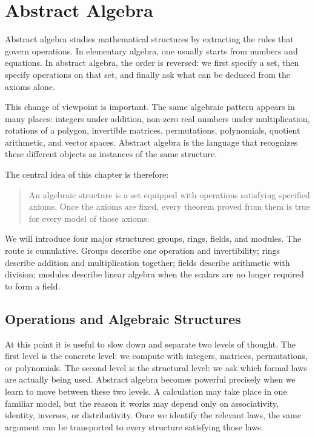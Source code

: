 \chapter{Abstract Algebra}

Abstract algebra studies mathematical structures by extracting the rules that govern operations. In elementary algebra, one usually starts from numbers and equations. In abstract algebra, the order is reversed: we first specify a set, then specify operations on that set, and finally ask what can be deduced from the axioms alone.

This change of viewpoint is important. The same algebraic pattern appears in many places: integers under addition, non-zero real numbers under multiplication, rotations of a polygon, invertible matrices, permutations, polynomials, quotient arithmetic, and vector spaces. Abstract algebra is the language that recognizes these different objects as instances of the same structure.

The central idea of this chapter is therefore:

\begin{quote}
    An algebraic structure is a set equipped with operations satisfying specified axioms. Once the axioms are fixed, every theorem proved from them is true for every model of those axioms.
\end{quote}

We will introduce four major structures: groups, rings, fields, and modules. The route is cumulative. Groups describe one operation and invertibility; rings describe addition and multiplication together; fields describe arithmetic with division; modules describe linear algebra when the scalars are no longer required to form a field.

\section{Operations and Algebraic Structures}


At this point it is useful to slow down and separate two levels of thought. The first level is the concrete level: we compute with integers, matrices, permutations, or polynomials. The second level is the structural level: we ask which formal laws are actually being used. Abstract algebra becomes powerful precisely when we learn to move between these two levels. A calculation may take place in one familiar model, but the reason it works may depend only on associativity, identity, inverses, or distributivity. Once we identify the relevant laws, the same argument can be transported to every structure satisfying those laws.

